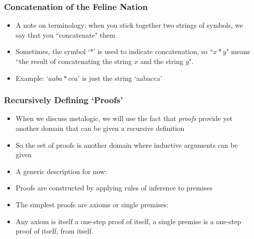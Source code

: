  \begin{frame}
\frametitle{Concatenation of the Feline Nation}

\begin{itemize}[<+->]
\item A note on terminology: when you stick together two strings of symbols, we say that you ``concatenate" them 

\item Sometimes, the symbol `$*$' is used to indicate concatenation, so ``$x*y$" means ``the result of concatenating the string $x$ and the string $y$".

\item Example: `$aaba*cca$' is just the string `aabacca'

\end{itemize} 
\end{frame}



 \begin{frame}
\frametitle{Recursively Defining `Proofs'}

\begin{itemize}[<+->]
\item When we discuss metalogic, we will use the fact that {\it{proofs}} provide yet another domain that can be given a recursive definition

\item So the set of proofs is another domain where inductive arguments can be given

\item A generic description for now:

\item Proofs are constructed by applying rules of inference to premises

\item The simplest proofs are axioms or single premises:
\bi
\item Any axiom is itself a one-step proof of itself, a single premise is a one-step proof of itself, from itself. 
\ei
\end{itemize} 
\end{frame}

